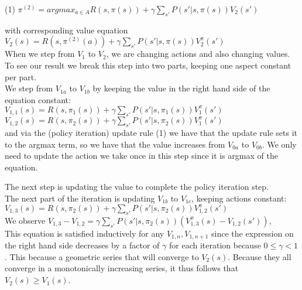 \documentclass[12pt]{scrartcl}
\begin{document}
(1) $\displaystyle{\pi^{(2)} = argmax_{a \in A} R(s, \pi(s)) + \gamma \sum_{s'}{P(s' | s, \pi(s))V_2(s')}}$

 with corresponding value equation $\displaystyle{V_2(s) = R(s, \pi^{(2)}(a)) +  \gamma \sum_{s'}{P(s' | s, \pi(s))V_2^{\pi}(s')}}$ \\

When we step from $V_1$ to $V_2$, we are changing actions and also changing values. To see our result we break this step into two parts, keeping one aspect constant per part. \\

We step from $V_{1a}$ to $V_{1b}$ by keeping the value in the right hand side of the equation constant: \\
$ V_{1,1}(s) = R(s, \pi_1(s)) +  \gamma \sum_{s'}{P(s' | s, \pi_1(s))V_1^{\pi}(s')}$ \\
$ V_{1,2}(s) = R(s, \pi_2(s)) +  \gamma \sum_{s'}{P(s' | s, \pi_2(s))V_1^{\pi}(s')}$ \\

and via the (policy iteration) update rule (1) we have that the update rule sets it to the argmax term, so we have that the value increases from $V_{0a}$ to $V_{0b}$. We only need to update the action we take once in this step since it is argmax of the equation.

The next step is updating the value to complete the policy iteration step. \\

The next part of the iteration is updating $V_{1b}$ to $V_{1c}$, keeping actions constant: \\

$V_{1,3}(s) = R(s, \pi_2(s)) +  \gamma \sum_{s'}{P(s' | s, \pi_2(s))V_{1,2}^{\pi}(s')}$ \\

We observe $V_{1,3} - V_{1,2} = \gamma \sum_{s'}{P(s' | s, \pi_2(s))(V_{1,3}^{\pi}(s) - V_{1,2}(s'))}$, \\

This equation is satisfied inductively for any $V_{1,n}, V_{1,n+1}$ since the expression on the right hand side decreases by a factor of $\gamma$ for each iteration because $0 \leq \gamma < 1$. This because a geometric series that will converge to $V_2(s)$. Because they all converge in a monotonically increasing series, it thus follows that $V_2(s) \geq V_1(s)$.
\end{document}
